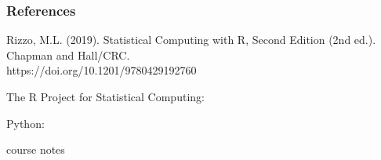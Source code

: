 \documentclass[border=5mm, convert, usenames, dvipsnames,beamer]{standalone}
\begin{document}
\begin{frame}[ fragile]{}

\frametitle{References}

\vspace{30}
\noindent
Rizzo, M.L. (2019). Statistical Computing with R, Second Edition (2nd ed.). Chapman and Hall/CRC. \\
https://doi.org/10.1201/9780429192760

\vspace{10}
\noindent
The R Project for Statistical Computing:

\noindent
{}

\vspace{10}
\noindent
Python:

\noindent
{}


\vspace{10}
\noindent
course notes

\end{frame}
\end{document}
